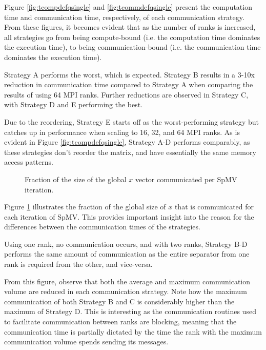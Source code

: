 Figure \ref{fig:tcompdefqsingle} and \ref{fig:tcommdefqsingle} present the computation time and communication time, respectively, of each communication strategy. From these figures, it becomes evident that as the number of ranks is increased, all strategies go from being compute-bound (i.e. the computation time dominates the execution time), to being communication-bound (i.e. the communication time dominates the execution time).
\medskip

Strategy A performs the worst, which is expected. Strategy B results in a 3-10x reduction in communication time compared to Strategy A when comparing the results of using 64 MPI ranks. Further reductions are observed in Strategy C, with Strategy D and E performing the best. 
\medskip

Due to the reordering, Strategy E starts off as the worst-performing strategy but catches up in performance when scaling to 16, 32, and 64 MPI ranks. As is evident in Figure \ref{fig:tcompdefqsingle}, Strategy A-D performs comparably, as these strategies don't reorder the matrix, and have essentially the same memory access patterns.

\begin{figure}[H]
    \centering
    \caption{Fraction of the size of the global \(x\) vector communicated per SpMV iteration.}
    \label{fig:commloaddefqsingle}
\end{figure}

Figure \ref{fig:commloaddefqsingle} illustrates the fraction of the global size of \(x\) that is communicated for each iteration of SpMV. This provides important insight into the reason for the differences between the communication times of the strategies.
\medskip

Using one rank, no communication occurs, and with two ranks, Strategy B-D performs the same amount of communication as the entire separator from one rank is required from the other, and vice-versa.
\medskip

From this figure, observe that both the average and maximum communication volume are reduced in each communication strategy. Note how the maximum communication of both Strategy B and C is considerably higher than the maximum of Strategy D. This is interesting as the communication routines used to facilitate communication between ranks are blocking, meaning that the communication time is partially dictated by the time the rank with the maximum communication volume spends sending its messages.
